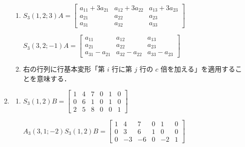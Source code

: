 \documentclass[11pt, uplatex, dvipdfmx]{jsarticle}
\begin{document}
\begin{enumerate}
\begin{enumerate}[(1)]
  \item $S_3(1,2;3)A=\left[
      \begin{array}{ccc}
        a_{11}+3a_{21} & a_{12}+3a_{22} & a_{13}+3a_{23}\\
        a_{21} & a_{22} & a_{23}\\
        a_{31} & a_{32} & a_{33}
      \end{array}
    \right]$ \vspace{1ex}

    $S_3(3,2;-1)A=\left[
      \begin{array}{ccc}
        a_{11} & a_{12} & a_{13}\\
        a_{21} & a_{22} & a_{23}\\
        a_{31}-a_{21} & a_{32} -a_{22} & a_{33}-a_{23}
      \end{array}
    \right]$
    
  \item 右の行列に行基本変形「第 $i$ 行に第 $j$ 行の $c$ 倍を加える」を適用することを意味する．
  \end{enumerate}

\item
  \begin{enumerate}[(1)]
    \setlength{\itemsep}{1ex}
    
  \item   $S_3(1,2)B=\left[
      \begin{array}{rrrrrr}
        1 & 4 & 7 & 0 & 1 & 0\\
        0 & 6 & 1 & 0 & 1 & 0\\
        2 & 5 & 8 & 0 & 0 & 1
      \end{array}
    \right]$ \vspace{1ex}

    $A_3(3,1;-2) S_3(1,2)B = \left[
      \begin{array}{rrrrrr}
        1 & 4 & 7 & 0 & 1 & 0\\
        0 & 3 & 6 & 1 & 0 & 0\\
        0 & -3 & -6 & 0 & -2 & 1
      \end{array}
    \right]$



\end{enumerate}
\end{enumerate}
\end{document}
